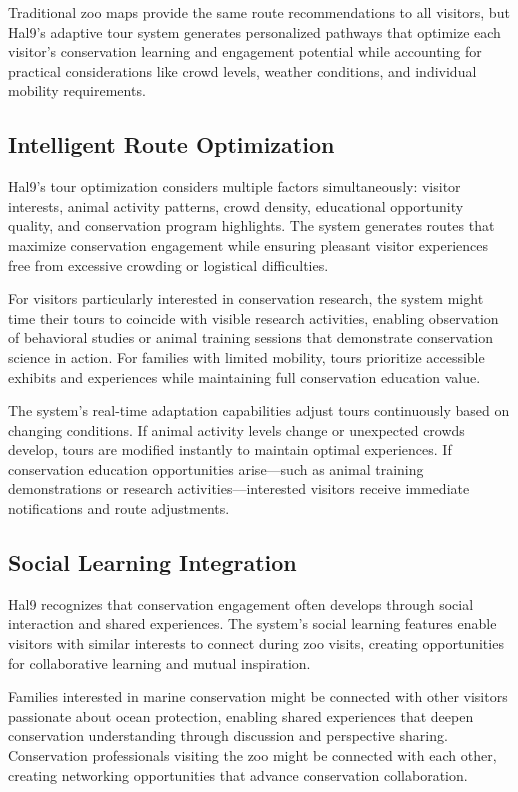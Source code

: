 \documentclass[
  Letterpaper,
]{scrbook}
\begin{document}
Traditional zoo maps provide the same route recommendations to all
visitors, but Hal9's adaptive tour system generates personalized
pathways that optimize each visitor's conservation learning and
engagement potential while accounting for practical considerations like
crowd levels, weather conditions, and individual mobility requirements.

\subsection{Intelligent Route
Optimization}\label{intelligent-route-optimization}

Hal9's tour optimization considers multiple factors simultaneously:
visitor interests, animal activity patterns, crowd density, educational
opportunity quality, and conservation program highlights. The system
generates routes that maximize conservation engagement while ensuring
pleasant visitor experiences free from excessive crowding or logistical
difficulties.

For visitors particularly interested in conservation research, the
system might time their tours to coincide with visible research
activities, enabling observation of behavioral studies or animal
training sessions that demonstrate conservation science in action. For
families with limited mobility, tours prioritize accessible exhibits and
experiences while maintaining full conservation education value.

The system's real-time adaptation capabilities adjust tours continuously
based on changing conditions. If animal activity levels change or
unexpected crowds develop, tours are modified instantly to maintain
optimal experiences. If conservation education opportunities
arise---such as animal training demonstrations or research
activities---interested visitors receive immediate notifications and
route adjustments.

\subsection{Social Learning
Integration}\label{social-learning-integration}

Hal9 recognizes that conservation engagement often develops through
social interaction and shared experiences. The system's social learning
features enable visitors with similar interests to connect during zoo
visits, creating opportunities for collaborative learning and mutual
inspiration.

Families interested in marine conservation might be connected with other
visitors passionate about ocean protection, enabling shared experiences
that deepen conservation understanding through discussion and
perspective sharing. Conservation professionals visiting the zoo might
be connected with each other, creating networking opportunities that
advance conservation collaboration.
\end{document}
